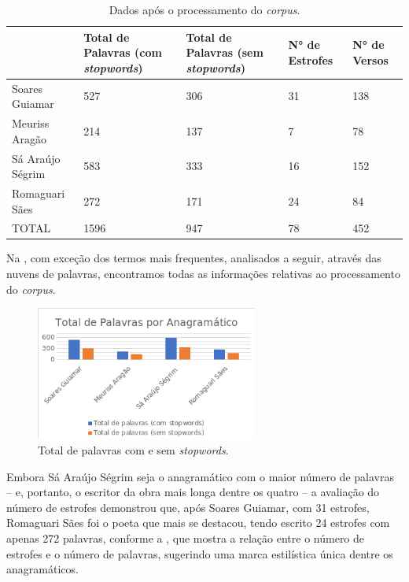 \documentclass[portuguese]{textolivre}
\begin{document}
\begin{table}[htbp]
\begin{threeparttable}
\caption{Dados após o processamento do \textit{corpus}.}
\label{tab01}
\centering
\begin{tabular}{p{3cm} p{2.5cm} p{2.5cm} p{2.5cm} p{2.5cm}}
\toprule
 & Total de Palavras (com \textit{stopwords}) & Total de Palavras (sem \textit{stopwords}) & N° de Estrofes & N° de Versos \\
\midrule 
Soares Guiamar & 527 & 306 & 31 & 138 \\
Meuriss Aragão & 214 & 137 & 7 & 78 \\
Sá Araújo Ségrim & 583 & 333 & 16 & 152 \\
Romaguari Sães & 272 & 171 & 24 & 84 \\
TOTAL & 1596 & 947 & 78 & 452 \\
\bottomrule
\end{tabular}
\end{threeparttable}
\end{table}

Na , com exceção dos termos mais frequentes, analisados a seguir, através das nuvens de palavras, encontramos todas as informações relativas ao processamento do \textit{corpus}. 

\begin{figure}[h!]
 \centering
 \includegraphics[width=0.65\textwidth]{fig-001.png}
 \caption{Total de palavras com e sem \textit{stopwords}.}
 \label{fig01}
\end{figure}

Embora Sá Araújo Ségrim seja o anagramático com o maior número de palavras – e, portanto, o escritor da obra mais longa dentre os quatro – a avaliação do número de estrofes demonstrou que, após Soares Guiamar, com 31 estrofes, Romaguari Sães foi o poeta que mais se destacou, tendo escrito 24 estrofes com apenas 272 palavras, conforme a , que mostra a relação entre o número de estrofes e o número de palavras, sugerindo uma marca estilística única dentre os anagramáticos. 
\end{document}
